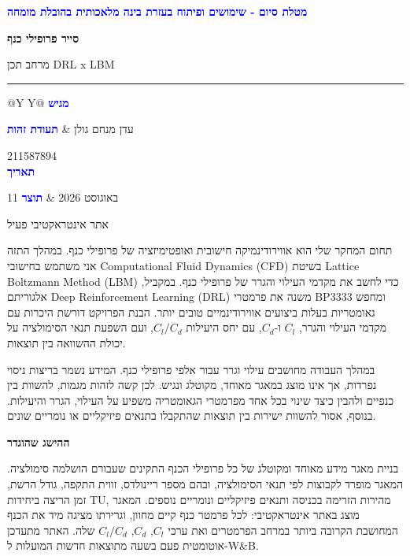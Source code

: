 \documentclass[10pt,a4paper]{article}
\newcommand{\eyebrow}[1]{\textcolor{Blue}{\fontsize{7.5}{8}\selectfont\bfseries #1}\par\vspace{2pt}}
\newcommand{\sectiontitle}[1]{\vspace{3pt}{\color{Navy}\fontsize{11.2}{13}\selectfont\bfseries #1\par}\vspace{1pt}}
\newcommand{\smallbody}{\fontsize{8.55}{10.35}\selectfont}
\begin{document}
\eyebrow{מטלת סיום - שימושים ופיתוח בעזרת בינה מלאכותית בהובלת מומחה}
{\color{Navy}\fontsize{29}{31}\selectfont\bfseries סייר פרופילי כנף\par}
{\color{Muted}\fontsize{13}{15}\selectfont מרחב תכן \textenglish{DRL x LBM}\par}
\vspace{3pt}\textcolor{Blue}{\rule{\textwidth}{1.25pt}}\vspace{4pt}

\begin{softcard}
\begin{tabularx}{\linewidth}{@{}Y Y@{}}
\eyebrow{מגיש} עדן מנחם גולן & \eyebrow{תעודת זהות} \textenglish{211587894} \\
\eyebrow{תאריך} 11 באוגוסט 2026 & \eyebrow{תוצר} אתר אינטראקטיבי פעיל
\end{tabularx}
\end{softcard}

\sectiontitle{1. מבוא למקצוע}
{\smallbody
תחום המחקר שלי הוא אווירודינמיקה חישובית ואופטימיזציה של פרופילי כנף. במהלך התזה אני משתמש בחישובי \textenglish{Computational Fluid Dynamics (CFD)} בשיטת \textenglish{Lattice Boltzmann Method (LBM)} כדי לחשב את מקדמי העילוי והגרר של פרופילי כנף. במקביל, אלגוריתם \textenglish{Deep Reinforcement Learning (DRL)} משנה את פרמטרי \textenglish{BP3333} ומחפש גאומטריות בעלות ביצועים אווירודינמיים טובים יותר. הבנת הפרויקט דורשת היכרות עם מקדמי העילוי והגרר, \textenglish{$C_l$} ו-\textenglish{$C_d$}, עם יחס היעילות \textenglish{$C_l/C_d$}, ועם השפעת תנאי הסימולציה על יכולת ההשוואה בין תוצאות.
}

\sectiontitle{הבעיה וההישג הנדרש}
{\smallbody
במהלך העבודה מחושבים עילוי וגרר עבור אלפי פרופילי כנף. המידע נשמר בריצות ניסוי נפרדות, אך אינו מוצג במאגר מאוחד, מקוטלג ונגיש. לכן קשה לזהות מגמות, להשוות בין כנפיים ולהבין כיצד שינוי בכל אחד מפרמטרי הגאומטריה משפיע על העילוי, הגרר והיעילות. בנוסף, אסור להשוות ישירות בין תוצאות שהתקבלו בתנאים פיזיקליים או נומריים שונים.
}

\begin{callout}
{\color{Navy}\bfseries\small ההישג שהוגדר}\par\vspace{1pt}
{\smallbody בניית מאגר מידע מאוחד ומקוטלג של כל פרופילי הכנף התקינים שעבורם הושלמה סימולציה. המאגר מופרד לקבוצות לפי תנאי הסימולציה, ובהם מספר ריינולדס, זווית התקפה, גודל הרשת, זמן הריצה ביחידות \textenglish{TU}, מהירות הזרימה בכניסה ותנאים פיזיקליים ונומריים נוספים. המאגר מוצג באתר אינטראקטיבי: לכל פרמטר כנף קיים מחוון, וגרירתו מציגה מיד את הכנף המחושבת הקרובה ביותר במרחב הפרמטרים ואת ערכי \textenglish{$C_l$, $C_d$, $C_l/C_d$} שלה. האתר מתעדכן אוטומטית פעם בשעה מתוצאות חדשות המועלות ל-\textenglish{W\&B}.}
\end{callout}
\end{document}
